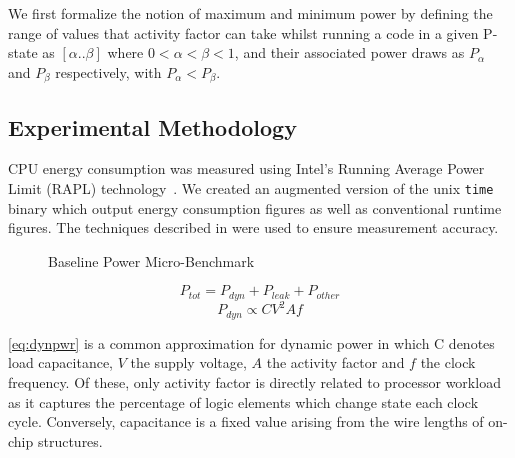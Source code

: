 We first formalize the notion of maximum and minimum power by defining the range of values that activity factor can take whilst running a code in a given P-state as $[\alpha  .. \beta]$ where $0 < \alpha < \beta < 1$, and their associated power draws as $P_{\alpha}$ and $P_{\beta}$ respectively, with $P_{\alpha} < P_{\beta}$. 

\subsection{Experimental Methodology}
CPU energy consumption was measured using Intel's Running Average Power Limit (RAPL) technology~\cite{david:2010aa}. 
We created an augmented version of the unix \texttt{time} binary which output energy consumption figures as well as conventional runtime figures.
The techniques described in \cite{hackenberg:2013aa} were used to ensure measurement accuracy. 


\begin{figure}[ht]                                                               
\centering                                                                      
\lstset{basicstyle=\ttfamily\footnotesize\bfseries, frame=tb} %
              
\caption{Baseline Power Micro-Benchmark}                            
\label{fig:microbench}                                                           
\end{figure}  


\begin{equation}
\label{eq:totpwr}
P_{tot} = P_{dyn} + P_{leak} + P_{other}
\end{equation}
\begin{equation} 
\label{eq:dynpwr}
P_{dyn} \propto CV^{2}Af
\end{equation}

\autoref{eq:dynpwr} is a common approximation for dynamic power in which C denotes load capacitance, $V$ the supply voltage, $A$ the activity factor and $f$ the clock frequency.
Of these, only activity factor is directly related to processor workload as it captures the percentage of logic elements which change state each clock cycle.
Conversely, capacitance is a fixed value arising from the wire lengths of on-chip structures.


